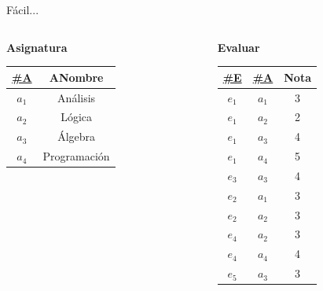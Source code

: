 \begin{frame}{F\'acil...}
\begin{columns}[T]
\begin{column}{0.68\linewidth}
\begin{columns}[T]
            \end{columns}

            \begin{center}
                \textbf{Asignatura}\\[2mm]

                \begin{tabular}{cc}
                    \underline{\#A} & ANombre\\[1mm]
                    \hline
                    $a_1$ & An\'alisis\\
                    $a_2$ & L\'ogica \\
                    $a_3$ & \'Algebra\\
                    $a_4$ & Programaci\'on
                    
                \end{tabular}
            \end{center}
            
        \end{column}

        \begin{column}{0.3\linewidth}
            \vspace{6mm}
            \begin{center}
                \textbf{Evaluar}\\[2mm]

                \begin{tabular}{ccc}
                    \underline{\#E} & \underline{\#A} & Nota\\[1mm]
                    \hline
                    $e_1$ & $a_1$ & 3\\
                    $e_1$ & $a_2$ & 2\\
                    $e_1$ & $a_3$ & 4\\
                    $e_1$ & $a_4$ & 5\\
                    $e_3$ & $a_3$ & 4\\
                    $e_2$ & $a_1$ & 3\\
                    $e_2$ & $a_2$ & 3\\
                    $e_4$ & $a_2$ & 3\\
                    $e_4$ & $a_4$ & 4\\
                    $e_5$ & $a_3$ & 3\\
                \end{tabular}
            \end{center}
        \end{column}
    \end{columns}
\end{frame}

